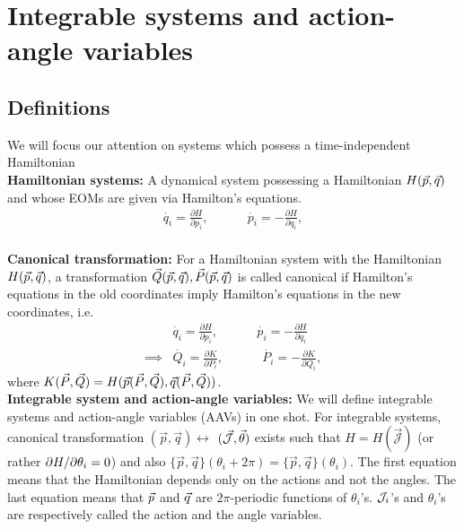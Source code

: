 \chapter{Integrable systems and action-angle variables}      \label{define_integrable_sys}

\section{Definitions}        \label{definition}

We will focus our attention on systems which possess a time-independent
Hamiltonian \\

\textbf{Hamiltonian systems:} A dynamical system possessing a 
Hamiltonian $H(\vec{p}, \vec{q})$ and whose EOMs are given 
via Hamilton's equations.
\begin{align}   
\dot{q_i} =  \frac{\partial H}{\partial p_i},~  ~~~~~~~~~~~~~
\dot{p_i} = - \frac{\partial H}{\partial q_i}, \\
\end{align}




\textbf{Canonical transformation:} For a Hamiltonian system with the
Hamiltonian $H(\vec{p}, \vec{q})$, a transformation $\vec{Q}(\vec{p}, \vec{q}),
\vec{P}(\vec{p}, \vec{q})$ is called canonical if Hamilton's equations in
the old coordinates imply Hamilton's equations in the new coordinates, i.e.
\begin{align}
& \dot{q_i} =  \frac{\partial H}{\partial p_i},~  ~~~~~~~~~~~~~
\dot{p_i} = - \frac{\partial H}{\partial q_i}    \\
\implies &  \dot{Q_i} =  \frac{\partial K}{\partial P_i},~  ~~~~~~~~~~~~~
\dot{P_i} = - \frac{\partial K}{\partial Q_i}, 
\end{align}
where $K (\vec{P}, \vec{Q}) =
   H(   \vec{p}(\vec{P}, \vec{Q}), \vec{q}(\vec{P}, \vec{Q}) )$. \\



\textbf{Integrable system and action-angle variables:} 
We will define integrable  systems and action-angle variables (AAVs)
in one shot.
For integrable systems, 
canonical transformation $( \vec{p}, \vec{q}) \leftrightarrow $ {$ (  \vec{\cal{J}} , \vec{\theta})$} exists such that {$H = H(\vec{\mathcal{J}})$}
(or rather $ \partial H/ \partial \theta_i = 0$)
and also
{$\{ \vec{p}, \vec{q} \}(\theta_i + 2 \pi)  = \{ \vec{p}, \vec{q} \}(\theta_i ) $}.
The first equation means that the Hamiltonian depends only on the actions 
and not the angles.
The last equation means that $\vec{p}$ and $\vec{q}$ are $2 \pi$-periodic
functions of $\theta_i$'s. $\mathcal{J}_i$'s and $\theta_i$'s are respectively called
the action and the angle variables.




